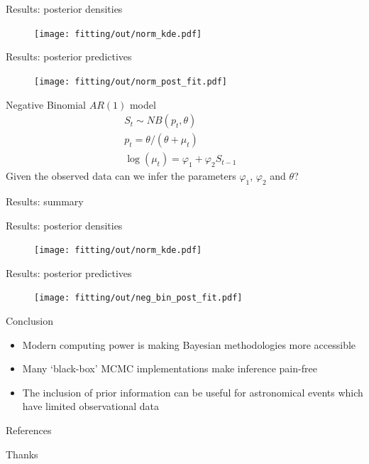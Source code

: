\documentclass[aspectratio=169]{beamer}
\begin{document}
\begin{frame}{Results: posterior densities}
  \begin{figure}
    \centering
    \texttt{[image: fitting/out/norm\_kde.pdf]}
  \end{figure}
\end{frame}

\begin{frame}{Results: posterior predictives}
  \vspace{-0.3cm}
  \begin{figure}
    \centering
    \texttt{[image: fitting/out/norm\_post\_fit.pdf]}
  \end{figure}
\end{frame}

\begin{frame}{Negative Binomial $AR(1)$ model}
  \begin{align*}
    S_{t} \sim NB(p_t, \theta)                 & \\
    p_t = \theta / (\theta + \mu_t)            & \\
    \log(\mu_t) = \varphi_1 + \varphi_2S_{t-1} &
  \end{align*}
  Given the observed data can we infer the parameters $\varphi_1$,
  $\varphi_2$ and $\theta$?
\end{frame}

\begin{frame}{Results: summary}
  \begin{table}
    \centering
    
    \caption{Summary of posterior samples after running Stan for $10\,000$ iterations (30 seconds).}
  \end{table}
\end{frame}

\begin{frame}{Results: posterior densities}
  \begin{figure}
    \centering
    \texttt{[image: fitting/out/norm\_kde.pdf]}
  \end{figure}
\end{frame}

\begin{frame}{Results: posterior predictives}
  \vspace{-0.3cm}
  \begin{figure}
    \centering
    \texttt{[image: fitting/out/neg\_bin\_post\_fit.pdf]}
  \end{figure}
\end{frame}

\begin{frame}{Conclusion}
  \begin{itemize}
    \item Modern computing power is making Bayesian methodologies more accessible
    \item Many `black-box' MCMC implementations make inference pain-free
    \item The inclusion of prior information can be useful for astronomical
          events which have limited observational data
  \end{itemize}
\end{frame}

\begin{frame}{References}
  \nocite{hilbe2017bayesian}
  
\end{frame}

\begin{frame}[standout]
  Thanks
\end{frame}
\end{document}
